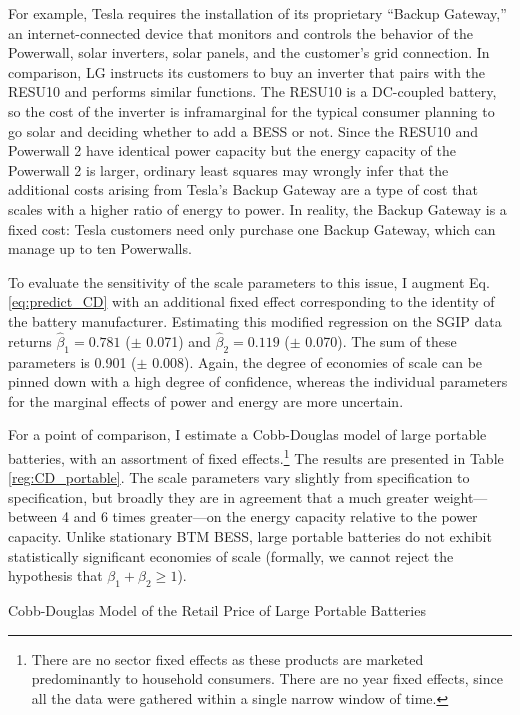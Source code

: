 For example, Tesla requires the installation of its proprietary ``Backup Gateway,'' an internet-connected device that monitors and controls the behavior of the Powerwall, solar inverters, solar panels, and the customer's grid connection. In comparison, LG instructs its customers to buy an inverter that pairs with the RESU10 and performs similar functions. The RESU10 is a DC-coupled battery, so the cost of the inverter is inframarginal for the typical consumer planning to go solar and deciding whether to add a BESS or not. Since the RESU10 and Powerwall 2 have identical power capacity but the energy capacity of the Powerwall 2 is larger, ordinary least squares may wrongly infer that the additional costs arising from Tesla's Backup Gateway are a type of cost that scales with a higher ratio of energy to power. In reality, the Backup Gateway is a fixed cost: Tesla customers need only purchase one Backup Gateway, which can manage up to ten Powerwalls.

To evaluate the sensitivity of the scale parameters to this issue, I augment Eq. \ref{eq:predict_CD} with an additional fixed effect corresponding to the identity of the battery manufacturer. Estimating this modified regression on the SGIP data returns $\hat{\beta}_1 = 0.781$ ($\pm$ 0.071) and $\hat{\beta}_2 = 0.119$ ($\pm$ 0.070). The sum of these parameters is 0.901 ($\pm$ 0.008). Again, the degree of economies of scale can be pinned down with a high degree of confidence, whereas the individual parameters for the marginal effects of power and energy are more uncertain.

For a point of comparison, I estimate a Cobb-Douglas model of large portable batteries, with an assortment of fixed effects.\footnote{There are no sector fixed effects as these products are marketed predominantly to household consumers. There are no year fixed effects, since all the data were gathered within a single narrow window of time.} The results are presented in Table \ref{reg:CD_portable}. The scale parameters vary slightly from specification to specification, but broadly they are in agreement that a much greater weight---between 4 and 6 times greater---on the energy capacity relative to the power capacity. Unlike stationary BTM BESS, large portable batteries do not exhibit statistically significant economies of scale (formally, we cannot reject the hypothesis that $\beta_1 + \beta_2 \geq 1$).

\begin{table}[t]
\centering

\caption{Cobb-Douglas Model of the Retail Price of Large Portable Batteries}\label{reg:CD_portable}
\end{table}

